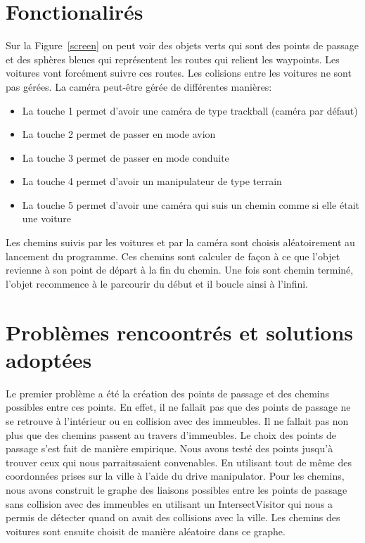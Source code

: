 \documentclass[a4paper, 11pt]{report}
\begin{document}
  \section*{Fonctionalirés}
  Sur la Figure~\ref{screen} on peut voir des objets verts qui sont des points de passage et des sphères
  bleues qui représentent les routes qui relient les waypoints. Les voitures vont forcément suivre ces routes.
  Les colisions entre les voitures ne sont pas gérées. La caméra peut-être gérée de différentes manières:
  \begin{itemize}
  \item La touche 1 permet d'avoir une caméra de type trackball (caméra par défaut)
  \item La touche 2 permet de passer en mode avion
  \item La touche 3 permet de passer en mode conduite
  \item La touche 4 permet d'avoir un manipulateur de type terrain
  \item La touche 5 permet d'avoir une caméra qui suis un chemin comme si elle était une voiture
  \end{itemize}
  Les chemins suivis par les voitures et par la caméra sont choisis aléatoirement au lancement du 
  programme. Ces chemins sont calculer de façon à ce que l'objet revienne à son point de départ à
  la fin du chemin. Une fois sont chemin terminé, l'objet recommence à le parcourir du début et il boucle
  ainsi à l'infini.

  \section*{Problèmes rencoontrés et solutions adoptées}
  Le premier problème a été la création des points de passage et des chemins possibles entre 
  ces points. En effet, il ne fallait pas que des points de passage ne se retrouve à l'intérieur ou en collision 
  avec des immeubles. Il ne fallait pas non plus que des chemins passent au travers d'immeubles. Le choix 
  des points de passage s'est fait de manière empirique. Nous avons testé des points jusqu'à trouver ceux 
  qui nous parraitssaient convenables. En utilisant tout de même des coordonnées prises sur la ville à l'aide 
  du drive manipulator. Pour les chemins, nous avons construit le graphe des liaisons possibles entre les 
  points de passage sans collision avec des immeubles en utilisant un IntersectVisitor qui nous a permis de 
  détecter quand on avait des collisions avec la ville. Les chemins des voitures sont ensuite choisit de 
  manière aléatoire dans ce graphe.
  
\end{document}

